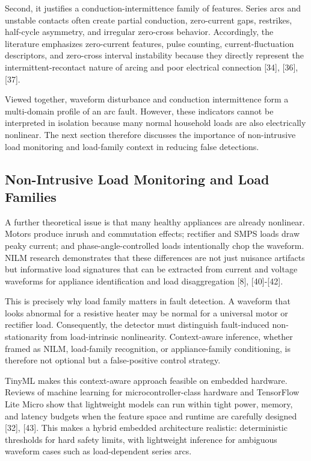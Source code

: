 Second, it justifies a conduction-intermittence family of features.
Series arcs and unstable contacts often create partial conduction,
zero-current gaps, restrikes, half-cycle asymmetry, and irregular
zero-cross behavior. Accordingly, the literature emphasizes zero-current
features, pulse counting, current-fluctuation descriptors, and
zero-cross interval instability because they directly represent the
intermittent-recontact nature of arcing and poor electrical connection
{[}34{]}, {[}36{]}, {[}37{]}.

Viewed together, waveform disturbance and conduction intermittence form
a multi-domain profile of an arc fault. However, these indicators cannot
be interpreted in isolation because many normal household loads are also
electrically nonlinear. The next section therefore discusses the
importance of non-intrusive load monitoring and load-family context in
reducing false detections.

\subsection{Non-Intrusive Load Monitoring and Load Families}\label{non-intrusive-load-monitoring-and-load-families}

A further theoretical issue is that many healthy appliances are already
nonlinear. Motors produce inrush and commutation effects; rectifier and
SMPS loads draw peaky current; and phase-angle-controlled loads
intentionally chop the waveform. NILM research demonstrates that these
differences are not just nuisance artifacts but informative load
signatures that can be extracted from current and voltage waveforms for
appliance identification and load disaggregation {[}8{]},
{[}40{]}-{[}42{]}.

This is precisely why load family matters in fault detection. A waveform
that looks abnormal for a resistive heater may be normal for a universal
motor or rectifier load. Consequently, the detector must distinguish
fault-induced non-stationarity from load-intrinsic nonlinearity.
Context-aware inference, whether framed as NILM, load-family
recognition, or appliance-family conditioning, is therefore not optional
but a false-positive control strategy.

TinyML makes this context-aware approach feasible on embedded hardware.
Reviews of machine learning for microcontroller-class hardware and
TensorFlow Lite Micro show that lightweight models can run within tight
power, memory, and latency budgets when the feature space and runtime
are carefully designed {[}32{]}, {[}43{]}. This makes a hybrid embedded
architecture realistic: deterministic thresholds for hard safety limits,
with lightweight inference for ambiguous waveform cases such as
load-dependent series arcs.


